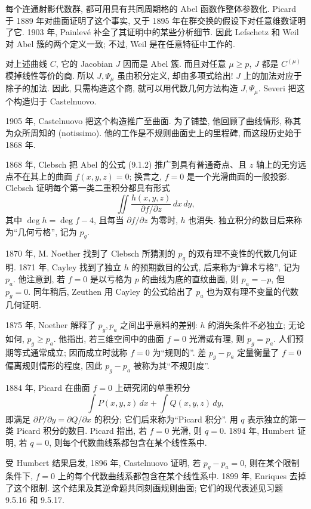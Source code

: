 每个连通射影代数群, 都可用具有共同周期格的 Abel 函数作整体参数化. Picard 于 1889 年对曲面证明了这个事实, 又于 1895 年在群交换的假设下对任意维数证明了它. 1903 年, Painlevé 补全了其证明中的某些分析细节. 因此 Lefschetz 和 Weil 对 Abel 簇的两个定义一致; 不过, Weil 是在任意特征中工作的.

对上述曲线 $C$, 它的 Jacobian $J$ 因而是 Abel 簇. 而且对任意 $\mu\geq p$, $J$ 都是 $C^{(\mu)}$ 模掉线性等价的商. 所以 $J,\Psi_\mu$ 虽由积分定义, 却由多项式给出! $J$ 上的加法对应于除子的加法. 因此, 只需构造这个商, 就可以用代数几何方法构造 $J,\Psi_\mu$. Severi 把这个构造归于 Castelnuovo.

1905 年, Castelnuovo 把这个构造推广至曲面. 为了铺垫, 他回顾了曲线情形, 称其为众所周知的 (notissimo). 他的工作是不规则曲面史上的里程碑, 而这段历史始于 1868 年.

1868 年, Clebsch 把 Abel 的公式 (9.1.2) 推广到具有普通奇点、且 $z$ 轴上的无穷远点不在其上的曲面 $f(x,y,z)=0$; 换言之, $f=0$ 是一个光滑曲面的一般投影. Clebsch 证明每个第一类二重积分都具有形式
\[
\iint\frac{h(x,y,z)}{\partial f/\partial z}\,dx\,dy,
\]
其中 $\deg h=\deg f-4$, 且每当 $\partial f/\partial z$ 为零时, $h$ 也消失. 独立积分的数目后来称为“几何亏格”, 记为 $p_g$.

1870 年, M. Noether 找到了 Clebsch 所猜测的 $p_g$ 的双有理不变性的代数几何证明. 1871 年, Cayley 找到了独立 $h$ 的预期数目的公式, 后来称为“算术亏格”, 记为 $p_a$. 他注意到, 若 $f=0$ 是以亏格为 $p$ 的曲线为底的直纹曲面, 则 $p_a=-p$, 但 $p_g=0$. 同年稍后, Zeuthen 用 Cayley 的公式给出了 $p_a$ 也为双有理不变量的代数几何证明.

1875 年, Noether 解释了 $p_g,p_a$ 之间出乎意料的差别: $h$ 的消失条件不必独立; 无论如何, $p_g\geq p_a$. 他指出, 若三维空间中的曲面 $f=0$ 光滑或有理, 则 $p_g=p_a$. 人们预期等式通常成立; 因而成立时就称 $f=0$ 为“规则的”. 差 $p_g-p_a$ 定量衡量了 $f=0$ 偏离规则情形的程度, 因此 $p_g-p_a$ 被称为其“不规则度”.

1884 年, Picard 在曲面 $f=0$ 上研究闭的单重积分
\[
\int P(x,y,z)\,dx+\int Q(x,y,z)\,dy,
\]
即满足 $\partial P/\partial y=\partial Q/\partial x$ 的积分; 它们后来称为“Picard 积分”. 用 $q$ 表示独立的第一类 Picard 积分的数目. Picard 指出, 若 $f=0$ 光滑, 则 $q=0$. 1894 年, Humbert 证明, 若 $q=0$, 则每个代数曲线系都包含在某个线性系中.

受 Humbert 结果启发, 1896 年, Castelnuovo 证明, 若 $p_g-p_a=0$, 则在某个限制条件下, $f=0$ 上的每个代数曲线系都包含在某个线性系中. 1899 年, Enriques 去掉了这个限制. 这个结果及其逆命题共同刻画规则曲面; 它们的现代表述见习题 9.5.16 和 9.5.17.

